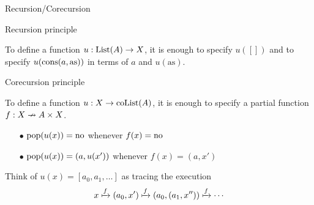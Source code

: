 \begin{frame}{Recursion/Corecursion} %

  \begin{block}{Recursion principle}
    
    \par To define a function $u : \operatorname{List}(A) \to X$, it is enough to specify $u([])$ and to specify $u(\operatorname{cons}(a, \mathrm{as}))$ in terms of $a$ and $u(\mathrm{as})$.

  \end{block}

  \pause

  \begin{block}{Corecursion principle}

    \par To define a function $u : X \to \operatorname{coList}(A)$, it is enough to specify a partial function $f : X \nrightarrow A \times X$.
    \pause
    \begin{itemize}
      \item[$\bullet$] {
        $\operatorname{pop}(u(x)) = \mathrm{no}$ whenever $f(x) = \mathrm{no}$
      }
      \item[$\bullet$] {
        $\operatorname{pop}(u(x)) = (a, u(x'))$ whenever $f(x) = (a, x')$
      }
    \end{itemize}
    \pause
    \par Think of $u(x) = [a_0, a_1, \ldots]$ as tracing the execution
    \vspace{-0.5 \baselineskip}
    \begin{align*}
      x \xmapsto{f} (a_0, x') \xmapsto{f} (a_0, (a_1, x'')) \xmapsto{f} \cdots
    \end{align*}
    
  \end{block}
  
\end{frame}

